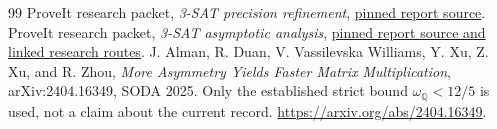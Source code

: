 \documentclass[11pt,letterpaper]{article}
\theoremstyle{remark}\newtheorem{remark}[theorem]{Remark}
\begin{document}
\begin{thebibliography}{99}
 ProveIt research packet, \emph{3-SAT precision refinement},
\href{https://github.com/VladimirReshetnikov/ProveIt/blob/fd0edd17e6a29117179b40a453c0def59165bd7c/Computability/SubexponentialSAT/Research/3sat_precision_refinement/report.tex}{pinned report source}.
 ProveIt research packet, \emph{3-SAT asymptotic analysis},
\href{https://github.com/VladimirReshetnikov/ProveIt/blob/fd0edd17e6a29117179b40a453c0def59165bd7c/Computability/SubexponentialSAT/Research/3sat_asymptotic_analysis/report/report.tex}{pinned report source and linked research routes}.
 J. Alman, R. Duan, V. Vassilevska Williams, Y. Xu, Z. Xu, and R. Zhou,
\emph{More Asymmetry Yields Faster Matrix Multiplication}, arXiv:2404.16349,
SODA 2025. Only the established strict bound $\omega_{\mathbb Q}<12/5$ is
used, not a claim about the current record.
\url{https://arxiv.org/abs/2404.16349}.
\end{thebibliography}
\end{document}
